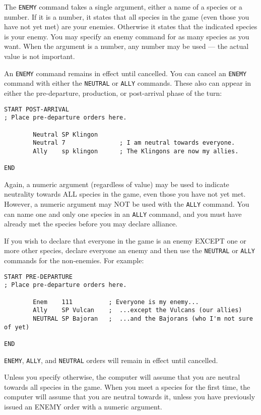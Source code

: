 \documentclass[10pt,titlepage]{article}
\begin{document}
The \texttt{ENEMY} command takes a single argument, either a name of a species or a
number.  If it is a number, it states that all species in the game (even those
you have not yet met) are your enemies.  Otherwise it states that the indicated
species is your enemy.  You may specify an enemy command for as many species as
you want.  When the argument is a number, any number may be used --- the actual
value is not important.

An \texttt{ENEMY} command remains in effect until cancelled.  You can cancel an \texttt{ENEMY}
command with either the \texttt{NEUTRAL} or \texttt{ALLY} commands.  These also can appear in
either the pre-departure, production, or post-arrival phase of the turn:

\begin{verbatim}
START POST-ARRIVAL
; Place pre-departure orders here.

        Neutral SP Klingon
        Neutral 7               ; I am neutral towards everyone.
        Ally    sp klingon      ; The Klingons are now my allies.

END\end{verbatim} 

Again, a numeric argument (regardless of value) may be used to indicate
neutrality towards ALL species in the game, even those you have not yet met.
However, a numeric argument may NOT be used with the \texttt{ALLY} command.  You can
name one and only one species in an \texttt{ALLY} command, and you must have already
met the species before you may declare alliance.

If you wish to declare that everyone in the game is an enemy EXCEPT one or
more other species, declare everyone an enemy and then use the \texttt{NEUTRAL} or
\texttt{ALLY} commands for the non-enemies.  For example:

\begin{verbatim}
START PRE-DEPARTURE
; Place pre-departure orders here.

        Enem    111          ; Everyone is my enemy...
        Ally    SP Vulcan    ;  ...except the Vulcans (our allies)
        NEUTRAL SP Bajoran   ;  ...and the Bajorans (who I'm not sure of yet)

END\end{verbatim} 

\texttt{ENEMY}, \texttt{ALLY}, and \texttt{NEUTRAL} orders will remain in effect until cancelled.

Unless you specify otherwise, the computer will assume that you are neutral
towards all species in the game.  When you meet a species for the first time,
the computer will assume that you are neutral towards it, unless you have
previously issued an ENEMY order with a numeric argument.
\end{document}
